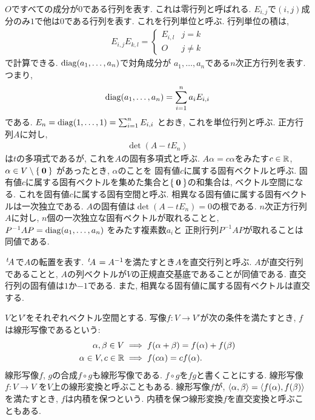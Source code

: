 $O$ですべての成分が$0$である行列を表す.
これは零行列と呼ばれる.
$E_{i,j}$で$(i,j)$成分のみ$1$で他は$0$である行列を表す.
これを行列単位と呼ぶ.
行列単位の積は,
\begin{align*}
  E_{i,j}E_{k,l}=
  \begin{cases}
    E_{i,l} & j=k\\
    O & j\neq k
  \end{cases}
\end{align*}
で計算できる.
$\operatorname{diag}(a_1,\ldots,a_n)$で対角成分が
$a_1,\ldots,a_n$である$n$次正方行列を表す.
つまり,
\begin{align*}
\operatorname{diag}(a_1,\ldots,a_n)=\sum_{i=1}^{n}a_iE_{i,i}
\end{align*}
である.
$E_n=\operatorname{diag}(1,\ldots,1)=\sum_{i=1}^{n}E_{i,i}$
とおき, これを単位行列と呼ぶ.
正方行列$A$に対し,
\begin{align*}
  \det(A-tE_n)
\end{align*}
は$t$の多項式であるが,
これを$A$の固有多項式と呼ぶ.
$A\alpha=c \alpha$をみたす$c\in \mathbb{R}$, $\alpha\in V\setminus\Set{\boldsymbol{0}}$
があったとき,
$\alpha$のことを
固有値$c$に属する固有ベクトルと呼ぶ.
固有値$c$に属する固有ベクトルを集めた集合と$\Set{\boldsymbol{0}}$の和集合は,
ベクトル空間になる.
これを固有値$c$に属する固有空間と呼ぶ.
相異なる固有値に属する固有ベクトルは一次独立である.
$A$の固有値は$\det(A-tE_n)=0$の根である.
$n$次正方行列$A$に対し,
$n$個の一次独立な固有ベクトルが取れることと,
$P^{-1}AP=\operatorname{diag}(a_1,\ldots,a_n)$
をみたす複素数$a_i$と
正則行列$P^{-1}AP$が取れることは同値である.

$\left.^{t}\!A\right.$で$A$の転置を表す.
$\left.^{t}\!A\right.=A^{-1}$を満たすとき$A$を直交行列と呼ぶ.
$A$が直交行列であることと,
$A$の列ベクトルが$V$の正規直交基底であることが同値である.
直交行列の固有値は$1$か$-1$である.
また,
相異なる固有値に属する固有ベクトルは直交する.


$V$と$V'$をそれぞれベクトル空間とする.
写像$f\colon V\to V'$が次の条件を満たすとき,
$f$は線形写像であるという:
\begin{align*}
  \alpha,\beta\in V &\implies f(\alpha+\beta)=f(\alpha)+f(\beta)\\
  \alpha\in V,c\in \mathbb{R} &\implies f(c\alpha)=cf(\alpha)  .
\end{align*}
線形写像$f$, $g$の合成$f\circ g$も線形写像である.
$f\circ g$を$fg$と書くことにする.
線形写像$f\colon V\to V$
を$V$上の線形変換と呼ぶこともある.
線形写像$f$が,
$\Braket{\alpha,\beta}=\Braket{f(\alpha),f(\beta)}$
を満たすとき,
$f$は内積を保つという.
内積を保つ線形変換$f$を直交変換と呼ぶこともある.


